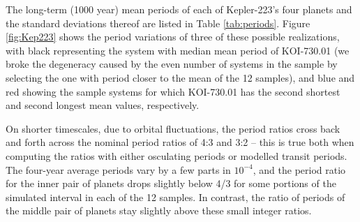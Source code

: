 \documentclass{aastex62}
\newcommand{\ik}{{\it Kepler~}}
\begin{document}
The long-term (1000 year) mean periods of each of Kepler-223's four planets and the standard deviations thereof are listed in Table \ref{tab:periods}.  Figure \ref{fig:Kep223} shows the period variations of three of these possible realizations, with black representing the system with median mean period of KOI-730.01 (we broke the degeneracy caused by the even number of systems in the sample by selecting the one with period closer to the mean of the 12 samples), and blue and red showing the sample systems for which KOI-730.01 has the second shortest and second longest mean values, respectively. 


On shorter timescales, due to orbital fluctuations, the period ratios cross back and forth across the nominal period ratios of 4:3 and 3:2 -- this is true both when computing the ratios with either osculating periods \citep[Extended Data Fig. 5]{Mills:2016} or modelled transit periods. The four-year average periods vary by a few parts in $10^{-4}$, and the period ratio for the inner pair of planets drops slightly below 4/3 for some portions of the simulated interval in each of the 12 samples. In contrast, the ratio of periods of the middle pair of planets stay slightly above these small integer ratios.


\end{document}
